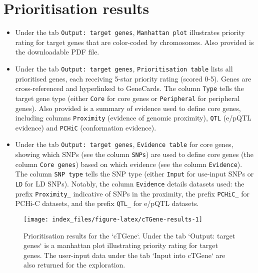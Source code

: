 \documentclass[
  oneside]{book}
\begin{document}
\hypertarget{prioritisation-results}{%
\section{Prioritisation results}\label{prioritisation-results}}

\begin{itemize}
\item
  Under the tab \texttt{Output:\ target\ genes}, \texttt{Manhattan\ plot} illustrates priority rating for target genes that are color-coded by chromosomes. Also provided is the downloadable PDF file.
\item
  Under the tab \texttt{Output:\ target\ genes}, \texttt{Prioritisation\ table} lists all prioritised genes, each receiving 5-star priority rating (scored 0-5). Genes are cross-referenced and hyperlinked to GeneCards. The column \texttt{Type} tells the target gene type (either \texttt{Core} for core genes or \texttt{Peripheral} for peripheral genes). Also provided is a summary of evidence used to define core genes, including columns \texttt{Proximity} (evidence of genomic proximity), \texttt{QTL} (e/pQTL evidence) and \texttt{PCHiC} (conformation evidence).
\item
  Under the tab \texttt{Output:\ target\ genes}, \texttt{Evidence\ table} for core genes, showing which SNPs (see the column \texttt{SNPs}) are used to define core genes (the column \texttt{Core\ genes}) based on which evidence (see the column \texttt{Evidence}). The column \texttt{SNP\ type} tells the SNP type (either \texttt{Input} for use-input SNPs or \texttt{LD} for LD SNPs). Notably, the column \texttt{Evidence} details datasets used: the prefix \texttt{Proximity\_} indicative of SNPs in the proximity, the prefix \texttt{PCHiC\_} for PCHi-C datasets, and the prefix \texttt{QTL\_} for e/pQTL datasets.
\end{itemize}

\begin{figure}

{\centering \texttt{[image: index\_files/figure-latex/cTGene-results-1]} 

}

\caption{Prioritisation results for the `cTGene`. Under the tab `Output: target genes` is a manhattan plot illustrating priority rating for target genes. The user-input data under the tab `Input into cTGene` are also returned for the exploration.}\label{fig:cTGene-results}
\end{figure}
\end{document}
